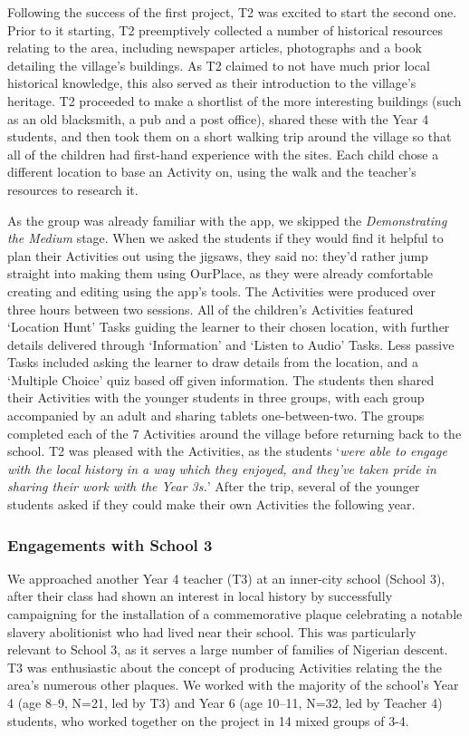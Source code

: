 Following the success of the first project, T2 was excited to start the second one. Prior to it starting, T2 preemptively collected a number of historical resources relating to the area, including newspaper articles, photographs and a book detailing the village's buildings. As T2 claimed to not have much prior local historical knowledge, this also served as their introduction to the village's heritage. T2 proceeded to make a shortlist of the more interesting buildings (such as an old blacksmith, a pub and a post office), shared these with the Year 4 students, and then took them on a short walking trip around the village so that all of the children had first-hand experience with the sites. Each child chose a different location to base an Activity on, using the walk and the teacher's resources to research it.

As the group was already familiar with the app, we skipped the \textit{Demonstrating the Medium} stage. When we asked the students if they would find it helpful to plan their Activities out using the jigsaws, they said no: they'd rather jump straight into making them using OurPlace, as they were already comfortable creating and editing using the app's tools. The Activities were produced over three hours between two sessions. All of the children's Activities featured `Location Hunt' Tasks guiding the learner to their chosen location, with further details delivered through `Information' and `Listen to Audio' Tasks. Less passive Tasks included asking the learner to draw details from the location, and a `Multiple Choice' quiz based off given information. The students then shared their Activities with the younger students in three groups, with each group accompanied by an adult and sharing tablets one-between-two. The groups completed each of the 7 Activities around the village before returning back to the school. T2 was pleased with the Activities, as the students `\textit{were able to engage with the local history in a way which they enjoyed, and they've taken pride in sharing their work with the Year 3s.}' After the trip, several of the younger students asked if they could make their own Activities the following year.

\subsubsection{Engagements with School 3}
We approached another Year 4 teacher (T3) at an inner-city school (School 3), after their class had shown an interest in local history by successfully campaigning for the installation of a commemorative plaque celebrating a notable slavery abolitionist who had lived near their school. This was particularly relevant to School 3, as it serves a large number of families of Nigerian descent. T3 was enthusiastic about the concept of producing Activities relating the the area's numerous other plaques. We worked with the majority of the school's Year 4 (age 8--9, N=21, led by T3) and Year 6 (age 10--11, N=32, led by Teacher 4) students, who worked together on the project in 14 mixed groups of 3-4.

